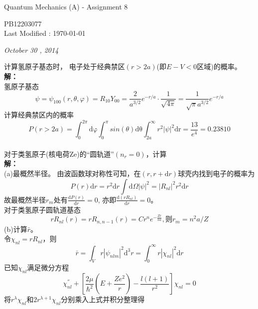\documentclass[a4paper]{article}
\newcommand{\dis}{\displaystyle}
\begin{document}
    \begin{center}
        \textsf{\LARGE{Quantum Mechanics (A) - Assignment 8}}\\[20pt]
    \end{center}
    \begin{CJK*}{UTF8}{kai}
        \begin{flushright}
            \small PB12203077\\
            \small Last Modified : \today\\[30pt]
        \end{flushright}
    \end{CJK*}
    \noindent\Large{\emph{October 30 , 2014}}\\[15pt]
    \begin{CJK*}{UTF8}{song}
     计算氢原子基态时，
        电子处于经典禁区$(r>2a)$(即$E-V<0$区域)的概率。\\[8pt]
    \textbf{解：}\\[5pt]
    {
    氢原子基态
    $$\psi=\psi_{100}(r,\theta,\varphi)=R_{10}Y_{00}
        =\frac{2}{a^{3/2}}e^{-r/a}\cdot\frac{1}{\sqrt{4\pi}}
        =\frac{1}{\sqrt{\pi}a^{3/2}}e^{-r/a}$$
    计算经典禁区内的概率
    $$P(r>2a)=\int_{0}^{2\pi}\mathrm{d\varphi}
        \int_{0}^{\pi}sin(\theta)\mathrm{d\theta}
        \int_{2a}^{\infty}r^{2}|\psi|^{2}\mathrm{dr}
        =\frac{13}{e^{4}}=0.23810$$
    }\\[20pt]
     对于类氢原子(核电荷Ze)的“圆轨道”$(n_{r}=0)$，计算\\[8pt]
    \textbf{解：}\\[5pt]
    {
    (a)最概然半径。
    由波函数球对称性可知，在$(r,r+\mathrm{d}r)$球壳内找到电子的概率为
    $$P(r)\mathrm{d}r=r^{2}\mathrm{d}r\int\mathrm{d}\Omega|\psi|^{2}
        =|R_{nl}|^{2}r^{2}\mathrm{d}r$$
    故最概然半径$r_{m}$处有$\dis\frac{\mathrm{d}P(r)}{\mathrm{d}r}=0$,
        亦即$\dis\frac{\mathrm{d}(r R_{nl})}{\mathrm{d}r}=0$。\\
    对于类氢原子圆轨道基态
    $$r R_{nl}(r)=r R_{n,n-1}(r)=C r^{n}e^{-\frac{Z r}{n a}},\mbox{则}r_{m}=n^{2}a/Z$$
    (b)计算$\bar{r}$。\\
    令$\chi_{nl}=r R_{nl}$，则
    $$\bar{r}=\int_{V}r|\psi_{nlm}|^{2}\mathrm{d}^{3}r
        =\int_{0}^{\infty}r|\chi_{nl}|^{2}\mathrm{d}r$$
    已知$\chi_{nl}$满足微分方程
    $$\chi_{nl}^{''}+[\frac{2\mu}{\hbar^{2}}(E+\frac{Z e^{2}}{r})
        -\frac{l(l+1)}{r^{2}}]\chi_{nl} = 0$$
    将$r^{\lambda}\chi_{nl}$和$2r^{\lambda+1}\chi_{nl}$分别乘入上式并积分整理得
}
\end{CJK*}
\end{document}
